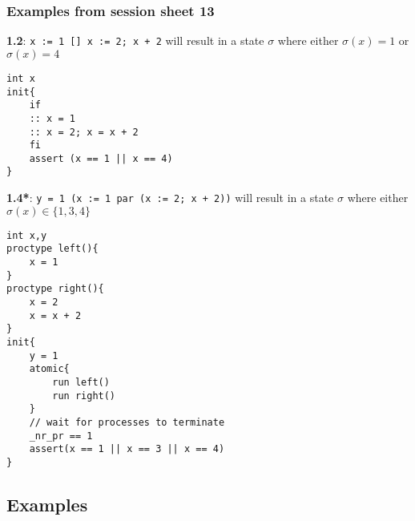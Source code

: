 \documentclass{article}
\begin{document}
\subsubsection{Examples from session sheet 13}
\textbf{1.2}: \texttt{x := 1 [] x := 2; x + 2} will result in a state $\sigma$ where either $\sigma(x)=1$ or $\sigma(x)=4$
\begin{verbatim}
int x
init{
    if 
    :: x = 1
    :: x = 2; x = x + 2
    fi
    assert (x == 1 || x == 4)
}
\end{verbatim}
\textbf{1.4*}: \texttt{y = 1 (x := 1 par (x := 2; x + 2))} will result in a state $\sigma$ where either $\sigma(x)\in \{1,3,4\}$
\begin{verbatim}
int x,y
proctype left(){
    x = 1
}
proctype right(){
    x = 2
    x = x + 2
}
init{
    y = 1
    atomic{
        run left()
        run right() 
    }
    // wait for processes to terminate
    _nr_pr == 1
    assert(x == 1 || x == 3 || x == 4)
}
\end{verbatim}

\subsection{Examples}
\end{document}
